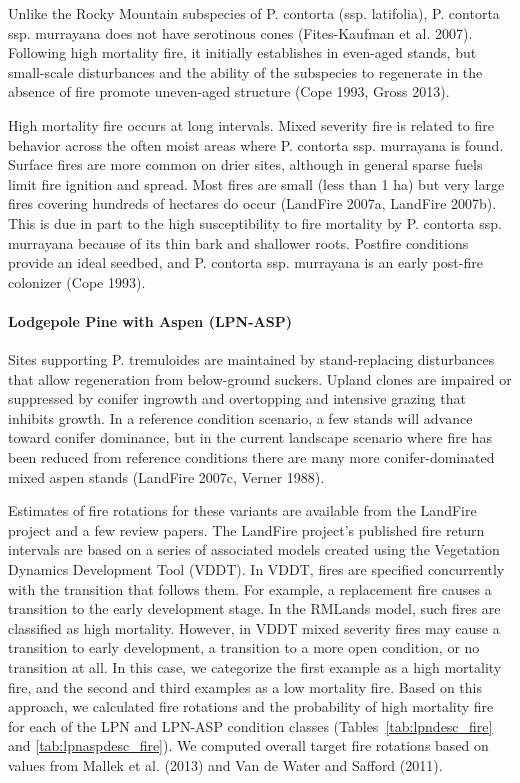 Unlike the Rocky Mountain subspecies of P. contorta (ssp. latifolia), P. contorta ssp. murrayana does not have serotinous cones (Fites-Kaufman et al. 2007). Following high mortality fire, it initially establishes in even-aged stands, but small-scale disturbances and the ability of the subspecies to regenerate in the absence of fire promote uneven-aged structure (Cope 1993, Gross 2013).

High mortality fire occurs at long intervals. Mixed severity fire is related to fire behavior across the often moist areas where P. contorta ssp. murrayana is found. Surface fires are more common on drier sites, although in general sparse fuels limit fire ignition and spread. Most fires are small (less than 1 ha) but very large fires covering hundreds of hectares do occur (LandFire 2007a, LandFire 2007b). This is due in part to the high susceptibility to fire mortality by P. contorta ssp. murrayana because of its thin bark and shallower roots. Postfire conditions provide an ideal seedbed, and P. contorta ssp. murrayana is an early post-fire colonizer (Cope 1993).

\paragraph{Lodgepole Pine with Aspen (LPN-ASP)}			Sites supporting P. tremuloides are maintained by stand-replacing disturbances that allow regeneration from below-ground suckers. Upland clones are impaired or suppressed by conifer ingrowth and overtopping and intensive grazing that inhibits growth. In a reference condition scenario, a few stands will advance toward conifer dominance, but in the current landscape scenario where fire has been reduced from reference conditions there are many more conifer-dominated mixed aspen stands (LandFire 2007c, Verner 1988). 

Estimates of fire rotations for these variants are available from the LandFire project and a few review papers. The LandFire project’s published fire return intervals are based on a series of associated models created using the Vegetation Dynamics Development Tool (VDDT). In VDDT, fires are specified concurrently with the transition that follows them. For example, a replacement fire causes a transition to the early development stage. In the RMLands model, such fires are classified as high mortality. However, in VDDT mixed severity fires may cause a transition to early development, a transition to a more open condition, or no transition at all. In this case, we categorize the first example as a high mortality fire, and the second and third examples as a low mortality fire. Based on this approach, we calculated fire rotations and the probability of high mortality fire for each of the LPN and LPN-ASP condition classes (Tables~\ref{tab:lpndesc_fire} and \ref{tab:lpnaspdesc_fire}). We computed overall target fire rotations based on values from Mallek et al. (2013) and Van de Water and Safford (2011). 



